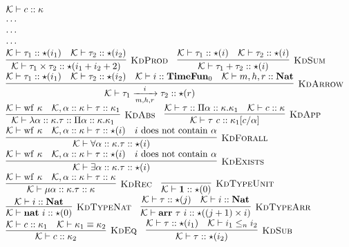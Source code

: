 \documentclass[fleqn]{article}
\begin{document}
\[
\begin{array}{l}
	\mathcal{K} \vdash c :: \kappa \\
	\cdots \\
	\cdots \\
	\cdots \\
	\infer[\textsc{KdProd}]{\mathcal{K} \vdash \tau_1 \times \tau_2 :: \star(i_1+i_2+2)}{\mathcal{K} \vdash \tau_1 :: \star(i_1) & \mathcal{K} \vdash \tau_2 :: \star(i_2)} \hspace{1em}
	\infer[\textsc{KdSum}]{\mathcal{K} \vdash \tau_1 + \tau_2 :: \star(i)}{\mathcal{K} \vdash \tau_1 :: \star(i) & \mathcal{K} \vdash \tau_2 :: \star(i)} \\
	\infer[\textsc{KdArrow}]{\mathcal{K} \vdash \tau_1 \xrightarrow[m,h,r]{i} \tau_2 :: \star(r)}{\mathcal{K} \vdash \tau_1 :: \star(i_1) & \mathcal{K} \vdash \tau_2 :: \star(i_2) & \mathcal{K} \vdash i :: \mathbf{TimeFun}_0 & \mathcal{K} \vdash m,h,r :: \mathbf{Nat}} \\
	\infer[\textsc{KdAbs}]{\mathcal{K} \vdash \lambda \alpha :: \kappa. \tau :: \Pi \alpha :: \kappa. \kappa_1}{\mathcal{K} \vdash \mathrm{wf}~\kappa & \mathcal{K},\alpha::\kappa \vdash \tau :: \kappa_1} \hspace{1em}
	\infer[\textsc{KdApp}]{\mathcal{K} \vdash \tau~c :: \kappa_1[c/\alpha]}{\mathcal{K} \vdash \tau :: \Pi \alpha :: \kappa. \kappa_1 & \mathcal{K} \vdash c :: \kappa} \\
	\infer[\textsc{KdForall}]{\mathcal{K} \vdash \forall \alpha :: \kappa. \tau :: \star(i)}{\mathcal{K} \vdash \mathrm{wf}~\kappa & \mathcal{K},\alpha :: \kappa \vdash \tau :: \star(i) & i~\mathrm{does~not~contain}~\alpha} \\
	\infer[\textsc{KdExists}]{\mathcal{K} \vdash \exists \alpha :: \kappa. \tau :: \star(i)}{\mathcal{K} \vdash \mathrm{wf}~\kappa & \mathcal{K},\alpha :: \kappa \vdash \tau :: \star(i) & i~\mathrm{does~not~contain}~\alpha} \\
	\infer[\textsc{KdRec}]{\mathcal{K} \vdash \mu \alpha :: \kappa. \tau :: \kappa}{\mathcal{K} \vdash \mathrm{wf}~\kappa & \mathcal{K},\alpha::\kappa \vdash \tau :: \kappa} \hspace{1em}
	\infer[\textsc{KdTypeUnit}]{\mathcal{K} \vdash \mathbf{1} :: \star(0)}{} \\
	\infer[\textsc{KdTypeNat}]{\mathcal{K} \vdash \mathbf{nat}~i :: \star(0)}{\mathcal{K} \vdash i :: \mathbf{Nat}} \hspace{1em}
	\infer[\textsc{KdTypeArr}]{\mathcal{K} \vdash \mathbf{arr}~\tau~i :: \star((j + 1) \times i)}{\mathcal{K} \vdash \tau :: \star(j) & \mathcal{K} \vdash i :: \mathbf{Nat}} \\
	\infer[\textsc{KdEq}]{\mathcal{K} \vdash c :: \kappa_2}{\mathcal{K} \vdash c :: \kappa_1 & \mathcal{K} \vdash \kappa_1 \equiv \kappa_2} \hspace{1em}
	\infer[\textsc{KdSub}]{\mathcal{K} \vdash \tau :: \star(i_2)}{\mathcal{K} \vdash \tau :: \star(i_1) & \mathcal{K} \vdash i_1 \le_n i_2}
\end{array}
\]
\end{document}
